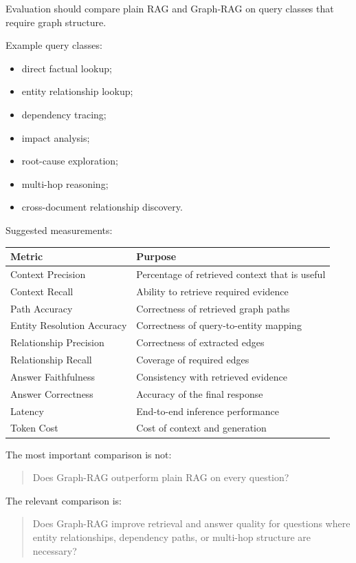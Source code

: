 \documentclass[11pt,a4paper]{article}
\begin{document}
Evaluation should compare plain RAG and Graph-RAG on query classes that require graph structure.

Example query classes:

\begin{itemize}
\item direct factual lookup;
\item entity relationship lookup;
\item dependency tracing;
\item impact analysis;
\item root-cause exploration;
\item multi-hop reasoning;
\item cross-document relationship discovery.
\end{itemize}

Suggested measurements:

\begin{center}
\begin{tabular}{ll}
\toprule
Metric & Purpose \\
\midrule
Context Precision & Percentage of retrieved context that is useful \\
Context Recall & Ability to retrieve required evidence \\
Path Accuracy & Correctness of retrieved graph paths \\
Entity Resolution Accuracy & Correctness of query-to-entity mapping \\
Relationship Precision & Correctness of extracted edges \\
Relationship Recall & Coverage of required edges \\
Answer Faithfulness & Consistency with retrieved evidence \\
Answer Correctness & Accuracy of the final response \\
Latency & End-to-end inference performance \\
Token Cost & Cost of context and generation \\
\bottomrule
\end{tabular}
\end{center}

The most important comparison is not:

\begin{quote}
Does Graph-RAG outperform plain RAG on every question?
\end{quote}

The relevant comparison is:

\begin{quote}
Does Graph-RAG improve retrieval and answer quality for questions where entity relationships, dependency paths, or multi-hop structure are necessary?
\end{quote}
\end{document}

